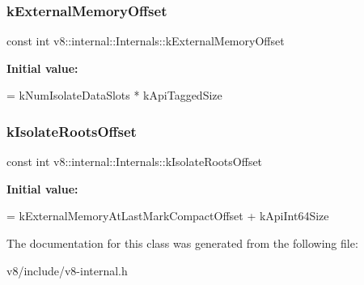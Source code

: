 \subsubsection{\texorpdfstring{k\+External\+Memory\+Offset}{kExternalMemoryOffset}}
{\footnotesize\ttfamily const int v8\+::internal\+::\+Internals\+::k\+External\+Memory\+Offset\hspace{0.3cm}{\ttfamily [static]}}

{\bfseries Initial value\+:}
\begin{DoxyCode}
=
      kNumIsolateDataSlots * kApiTaggedSize
\end{DoxyCode}
\mbox{\label{classv8_1_1internal_1_1Internals_a3142f942a25203ce7fca0e9a4563c74d}} 
\subsubsection{\texorpdfstring{k\+Isolate\+Roots\+Offset}{kIsolateRootsOffset}}
{\footnotesize\ttfamily const int v8\+::internal\+::\+Internals\+::k\+Isolate\+Roots\+Offset\hspace{0.3cm}{\ttfamily [static]}}

{\bfseries Initial value\+:}
\begin{DoxyCode}
=
      kExternalMemoryAtLastMarkCompactOffset + kApiInt64Size
\end{DoxyCode}


The documentation for this class was generated from the following file\+:\begin{DoxyCompactItemize}
\item 
v8/include/v8-\/internal.\+h\end{DoxyCompactItemize}
